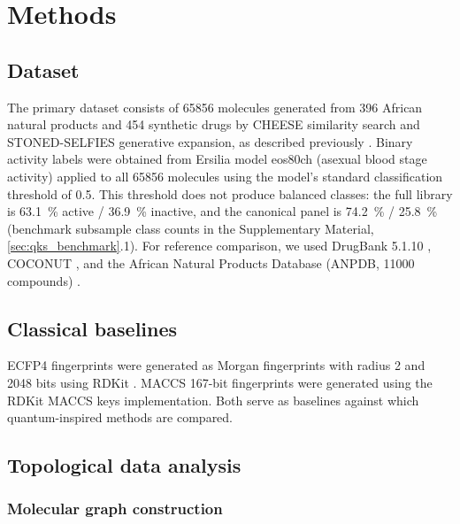 \documentclass[11pt,a4paper]{article}
\begin{document}

\section{Methods}

\subsection{Dataset}

The primary dataset consists of \num{65856} molecules generated from \num{396} African natural products and \num{454} synthetic drugs by CHEESE similarity search \citep{lzicar_cheese_2024} and STONED-SELFIES generative expansion, as described previously \citep{temgoua2026antimalarial}. Binary activity labels were obtained from Ersilia model eos80ch (asexual blood stage activity) applied to all \num{65856} molecules using the model's standard classification threshold of \num{0.5}. This threshold does not produce balanced classes: the full library is \qty{63.1}{\percent} active / \qty{36.9}{\percent} inactive, and the canonical panel is \qty{74.2}{\percent} / \qty{25.8}{\percent} (benchmark subsample class counts in the Supplementary Material, \cref{sec:qks_benchmark}.1). For reference comparison, we used DrugBank 5.1.10 \citep{drugbank_2018}, COCONUT \citep{coconut_2021}, and the African Natural Products Database (ANPDB, \num{11000} compounds) \citep{anpdb_2026}.

\subsection{Classical baselines}

ECFP4 fingerprints were generated as Morgan fingerprints with radius 2 and \num{2048} bits using RDKit \citep{rdkit_2024}. MACCS \num{167}-bit fingerprints were generated using the RDKit MACCS keys implementation. Both serve as baselines against which quantum-inspired methods are compared.

\subsection{Topological data analysis}

\subsubsection{Molecular graph construction}
\end{document}
